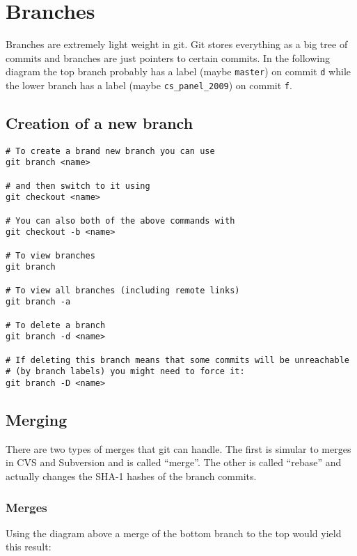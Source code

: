 \documentclass[letterpaper,12pt]{article}
\begin{document}
\section{Branches}

Branches are extremely light weight in git. Git stores everything as a big tree
of commits and branches are just pointers to certain commits. In the following
diagram the top branch probably has a label (maybe \texttt{master}) on commit
\texttt{d} while the lower branch has a label (maybe \texttt{cs\_panel\_2009}) on
commit \texttt{f}.


\subsection{Creation of a new branch}

\begin{verbatim}
# To create a brand new branch you can use
git branch <name>

# and then switch to it using
git checkout <name>

# You can also both of the above commands with
git checkout -b <name>

# To view branches
git branch

# To view all branches (including remote links)
git branch -a

# To delete a branch
git branch -d <name>

# If deleting this branch means that some commits will be unreachable
# (by branch labels) you might need to force it:
git branch -D <name>
\end{verbatim}

\subsection{Merging}

There are two types of merges that git can handle. The first is simular to
merges in CVS and Subversion and is called ``merge''. The other is called
``rebase'' and actually changes the SHA-1 hashes of the branch commits.

\subsubsection{Merges}
Using the diagram above a merge of the bottom branch to the top would yield this
result:
\end{document}
